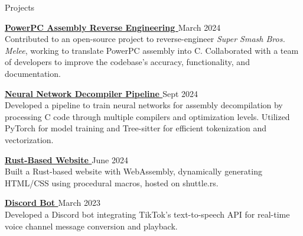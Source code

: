 \documentclass{resume}
\newcommand{\scaledfaExternalLink}{\raisebox{0.1\height}{\scalebox{0.7}{\faExternalLink*}}}
\begin{document}
\begin{rSection}{Projects}

	\item {\bf \href{https://github.com/search?q=repo\%3Adoldecomp\%2Fmelee++author\%3Awyatt-avilla&type=pullrequests&ref=advsearch}{PowerPC Assembly Reverse Engineering \scaledfaExternalLink}} {\hfill March 2024} \\
	Contributed to an open-source project to reverse-engineer \textit{Super Smash Bros. Melee}, working to translate PowerPC assembly into C. Collaborated with a team of developers to improve the codebase's accuracy, functionality, and documentation.

	\item {\bf \href{https://github.com/wyatt-avilla/sunbird}{Neural Network Decompiler Pipeline \scaledfaExternalLink}} {\hfill Sept 2024} \\
	Developed a pipeline to train neural networks for assembly decompilation by processing C code through multiple compilers and optimization levels. Utilized PyTorch for model training and Tree-sitter for efficient tokenization and vectorization.

	\item {\bf \href{https://github.com/wyatt-avilla/feframe}{Rust-Based Website \scaledfaExternalLink}} {\hfill June 2024} \\
	Built a Rust-based website with WebAssembly, dynamically generating HTML/CSS using procedural macros, hosted on shuttle.rs.

	\item {\bf \href{https://github.com/wyatt-avilla/discord-tiktok-tts-bot}{Discord Bot \scaledfaExternalLink}} {\hfill March 2023} \\
	Developed a Discord bot integrating TikTok's text-to-speech API for real-time voice channel message conversion and playback.

\end{rSection}
\end{document}
